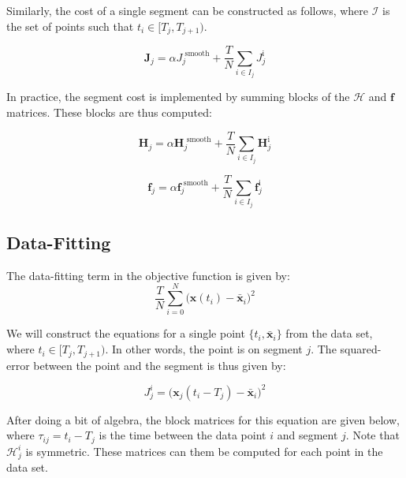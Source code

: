 Similarly, the cost of a single segment can be constructed as follows,
where $\mathcal{I}$ is the set of points such that $t_i \in [T_j, T_{j+1})$.

\begin{equation}
  \bm{J}_j =  \alpha J_j^\text{ smooth}
  + \frac{T}{N} \sum_{i \in I_j}  J_{j}^\text{i}
\end{equation}

In practice, the segment cost is implemented by
summing blocks of the $\mathcal{H}$ and $\bm{f}$ matrices.
These blocks are thus computed:

\begin{equation}
  \bm{H}_j =  \alpha \bm{H}_j^\text{ smooth}
  + \frac{T}{N} \sum_{i \in I_j}  \bm{H}_{j}^\text{i}
\end{equation}

\begin{equation}
  \bm{f}_j =  \alpha \bm{f}_j^\text{ smooth}
  + \frac{T}{N} \sum_{i \in I_j}  \bm{f}_{j}^\text{i}
\end{equation}


\subsection{Data-Fitting}
The data-fitting term in the objective function is given by:
\begin{equation}
  \frac{T}{N}  \sum_{i=0}^N \big( \bm{x}(t_i) - \bar{\bm{x}}_i \big)^2
\end{equation}

We will construct the equations for a single  point $\{t_i, \bar{\bm{x}}_i\}$ from the data set,
where $t_i \in [T_j, T_{j+1})$.
In other words, the point is on segment $j$.
The squared-error between the point and the segment is thus given by:

\begin{equation}
  J_j^i = \bigg( \bm{x}_j(t_i-T_j) - \bar{\bm{x}}_i\bigg) ^ 2
\end{equation}

After doing a bit of algebra, the block matrices for this equation are given below,
where $\tau_{ij} = t_i-T_j$ is the time between the data point $i$ and segment $j$.
Note that $\mathcal{H}_j^i$ is symmetric.
These matrices can them be computed for each point in the data set.

